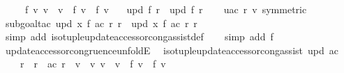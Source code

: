 \begin{isabellebody}
\ \ \ \ \ f{\isacharcolon}{\kern0pt}\ {\isachardoublequoteopen}{\isasymAnd}v{\isachardot}{\kern0pt}\ v{\isacharprime}{\kern0pt}\ {\isacharequal}{\kern0pt}\ v\ {\isasymLongrightarrow}\ f\ v\ {\isacharequal}{\kern0pt}\ f{\isacharprime}{\kern0pt}\ v{\isachardoublequoteclose}\isanewline
\ \ \ {\isachardoublequoteopen}upd\ f\ r\ {\isacharequal}{\kern0pt}\ upd\ f{\isacharprime}{\kern0pt}\ r{\isacharprime}{\kern0pt}{\isachardoublequoteclose}\isanewline
%
\isadelimproof
\ \ %
\endisadelimproof
%
\isatagproof
{}\isamarkupfalse%
\ uac\ r\ v\ {\isacharbrackleft}{\kern0pt}symmetric{\isacharbrackright}{\kern0pt}\isanewline
\ \ \isamarkupfalse%
\ {\isacharparenleft}{\kern0pt}subgoal{\isacharunderscore}{\kern0pt}tac\ {\isachardoublequoteopen}upd\ {\isacharparenleft}{\kern0pt}{\isasymlambda}x{\isachardot}{\kern0pt}\ f\ {\isacharparenleft}{\kern0pt}ac\ r{\isacharprime}{\kern0pt}{\isacharparenright}{\kern0pt}{\isacharparenright}{\kern0pt}\ r{\isacharprime}{\kern0pt}\ {\isacharequal}{\kern0pt}\ upd\ {\isacharparenleft}{\kern0pt}{\isasymlambda}x{\isachardot}{\kern0pt}\ f{\isacharprime}{\kern0pt}\ {\isacharparenleft}{\kern0pt}ac\ r{\isacharprime}{\kern0pt}{\isacharparenright}{\kern0pt}{\isacharparenright}{\kern0pt}\ r{\isacharprime}{\kern0pt}{\isachardoublequoteclose}{\isacharparenright}{\kern0pt}\isanewline
\ \ \ \isamarkupfalse%
\ {\isacharparenleft}{\kern0pt}simp\ add{\isacharcolon}{\kern0pt}\ iso{\isacharunderscore}{\kern0pt}tuple{\isacharunderscore}{\kern0pt}update{\isacharunderscore}{\kern0pt}accessor{\isacharunderscore}{\kern0pt}cong{\isacharunderscore}{\kern0pt}assist{\isacharunderscore}{\kern0pt}def{\isacharparenright}{\kern0pt}\isanewline
\ \ \isamarkupfalse%
\ {\isacharparenleft}{\kern0pt}simp\ add{\isacharcolon}{\kern0pt}\ f{\isacharparenright}{\kern0pt}\isanewline
\ \ \isamarkupfalse%
%
\endisatagproof
{\isafoldproof}%
%
\isadelimproof
\isanewline
%
\endisadelimproof
\isanewline
{}\isamarkupfalse%
\ update{\isacharunderscore}{\kern0pt}accessor{\isacharunderscore}{\kern0pt}congruence{\isacharunderscore}{\kern0pt}unfoldE{\isacharcolon}{\kern0pt}\isanewline
\ \ {\isachardoublequoteopen}iso{\isacharunderscore}{\kern0pt}tuple{\isacharunderscore}{\kern0pt}update{\isacharunderscore}{\kern0pt}accessor{\isacharunderscore}{\kern0pt}cong{\isacharunderscore}{\kern0pt}assist\ upd\ ac\ {\isasymLongrightarrow}\isanewline
\ \ \ \ r\ {\isacharequal}{\kern0pt}\ r{\isacharprime}{\kern0pt}\ {\isasymLongrightarrow}\ ac\ r{\isacharprime}{\kern0pt}\ {\isacharequal}{\kern0pt}\ v{\isacharprime}{\kern0pt}\ {\isasymLongrightarrow}\ {\isacharparenleft}{\kern0pt}{\isasymAnd}v{\isachardot}{\kern0pt}\ v\ {\isacharequal}{\kern0pt}\ v{\isacharprime}{\kern0pt}\ {\isasymLongrightarrow}\ f\ v\ {\isacharequal}{\kern0pt}\ f{\isacharprime}{\kern0pt}\ v{\isacharparenright}{\kern0pt}\ {\isasymLongrightarrow}\isanewline

\end{isabellebody}

